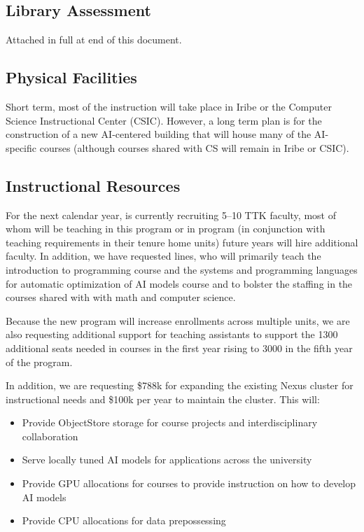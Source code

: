 \newcommand{\ttkfaculty}{5--10}
\newcommand{\advisors}{5}
\newcommand{\admin}{1}
\newcommand{\cloud}{30k}
\newcommand{\upfrontcluster}{788k}
\newcommand{\continuingcluster}{100k}



\subsection{Library Assessment}

Attached in full at end of this document.

\subsection{Physical Facilities}

Short term, most of the instruction will take place in Iribe or the Computer Science Instructional Center (CSIC).  However, a long term plan is for the construction of a new AI-centered building that will house many of the AI-specific courses (although courses shared with CS will remain in Iribe or CSIC).

\subsection{Instructional Resources}



For the next calendar year, \aim{} is currently recruiting \ttkfaculty{} TTK faculty, most of whom will be teaching in this program or  in  program (in conjunction with teaching requirements in their tenure home units) future years will hire additional faculty.  In addition, we have requested  lines, who will primarily teach the introduction to programming course and the systems and programming languages for automatic optimization of AI models course and to bolster the staffing in the courses shared with with math and computer science.

Because the new program will increase enrollments across multiple units, we are also requesting additional support for teaching assistants to support the 1300 additional seats needed in courses in the first year rising to 3000 in the fifth year of the program.

In addition, we are requesting \$\upfrontcluster{} for expanding the existing Nexus cluster for instructional needs and \$\continuingcluster{} per year to maintain the cluster.  This will:
\begin{itemize}
    \item Provide ObjectStore storage for course projects and interdisciplinary collaboration
    \item Serve locally tuned AI models for applications across the university
    \item Provide GPU allocations for courses to provide instruction on how to develop AI models
    \item Provide CPU allocations for data prepossessing
\end{itemize}

